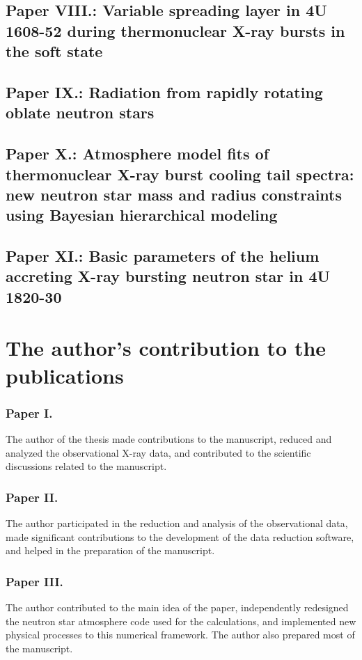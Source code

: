 \subsection*{Paper VIII.: Variable spreading layer in 4U 1608-52 during thermonuclear X-ray bursts in the soft state}


\subsection*{Paper IX.: Radiation from rapidly rotating oblate neutron stars}

\subsection*{Paper X.: Atmosphere model fits of thermonuclear X-ray burst cooling tail spectra: new neutron star mass and radius constraints using Bayesian hierarchical modeling}

\subsection*{Paper XI.: Basic parameters of the helium accreting X-ray bursting neutron star in 4U 1820-30}


\section{The author's contribution to the publications} 

\subsubsection*{Paper I.}
The author of the thesis made contributions to the manuscript, reduced and analyzed the observational X-ray data, and contributed to the scientific discussions related to the manuscript.


\subsubsection*{Paper II.}
The author participated in the reduction and analysis of the observational data, made significant contributions to the development of the data reduction software, and helped in the preparation of the manuscript.


\subsubsection*{Paper III.}
The author contributed to the main idea of the paper, independently redesigned the neutron star atmosphere code used for the calculations, and implemented new physical processes to this numerical framework. 
The author also prepared most of the manuscript.


